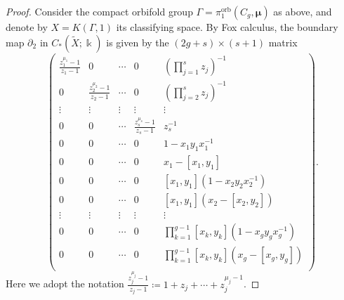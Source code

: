 \documentclass[11pt]{amsart}
\theoremstyle{definition}
\renewcommand{\k}{\Bbbk}
\DeclareMathOperator{\orb}{orb}
\begin{document}
\begin{proof}
Consider the compact orbifold group $\Gamma=\pi_1^{\orb}(C_{g},{\bm \mu})$ 
as above, and denote by $X=K(\Gamma,1)$ its classifying space. By Fox calculus, 
the boundary map $\partial_2$ in $C_*(\widetilde{X};\k)$ is given by the 
$(2g+s)\times (s+1)$ matrix 
\[ 
\begin{pmatrix} 
\label{matrix compact} 
\frac{z_{1}^{\mu_{1}}-1}{z_{1}-1} & 0 & \cdots & 0 & (\prod_{j=1}^s z_j)^{-1} \\
0 & \frac{z_{2}^{\mu_{2}}-1}{z_{2}-1} & \cdots & 0 & (\prod_{j=2}^s z_j)^{-1} \\
\vdots & \vdots & \vdots & \vdots & \vdots \\
0 & 0 & \cdots & \frac{z_{s}^{\mu_{s}}-1}{z_{s}-1} &  z_s^{-1} \\
0& 0 & \cdots & 0 & 1-x_1y_1x_1^{-1} \\
0& 0 & \cdots & 0 & x_1-[x_{1},y_{1}] \\
0& 0 & \cdots & 0 & [x_1,y_1] (1-x_2y_2x_2^{-1}) \\
0& 0 & \cdots & 0 & [x_1,y_1] (x_2-[x_{2},y_{2}]) \\
\vdots& \vdots & \vdots & \vdots & \vdots \\
0& 0 & \cdots & 0 & \prod_{k=1}^{g-1}[x_k,y_k] (1-x_g y_g x_g^{-1}) \\
0& 0 & \cdots & 0 & \prod_{k=1}^{g-1}[x_k,y_k] (x_g-[x_{g},y_{g}]) \\
\end{pmatrix}. 
\]
Here we adopt the notation $\frac{z_{j}^{\mu_{j}}-1}{z_{j}-1}\coloneqq 
1+z_j+\cdots+z_j^{\mu_j-1}$.


\end{proof}
\end{document}
